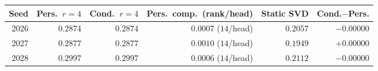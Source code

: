\begin{tabular}{rrrrrr}
\toprule
Seed & Pers.\ $r{=}4$ & Cond.\ $r{=}4$ & Pers.\ comp.\ (rank/head) & Static SVD & Cond.$-$Pers. \\
\midrule
2026 & $0.2874$ & $0.2874$ & $0.0007$ ($14$/head) & $0.2057$ & $-0.00000$ \\
2027 & $0.2877$ & $0.2877$ & $0.0010$ ($14$/head) & $0.1949$ & $+0.00000$ \\
2028 & $0.2997$ & $0.2997$ & $0.0006$ ($14$/head) & $0.2112$ & $-0.00000$ \\
\bottomrule
\end{tabular}
